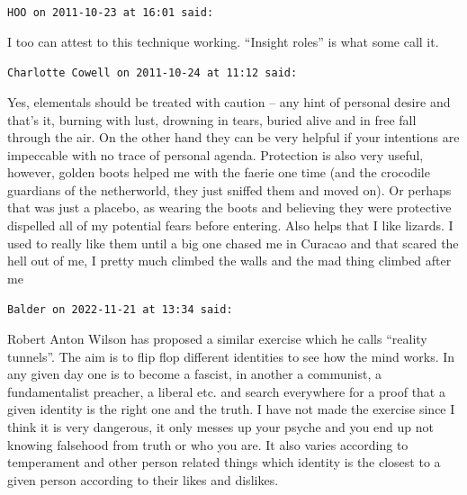 \begin{footnotesize}
\begin{sffamily}
\texttt{HOO on 2011-10-23 at 16:01 said:}

I too can attest to this technique working. ``Insight roles'' is what some call it.

\hfill

\texttt{Charlotte Cowell on 2011-10-24 at 11:12 said:}

Yes, elementals should be treated with caution -- any hint of personal desire and that's it, burning with lust, drowning in tears, buried alive and in free fall through the air. On the other hand they can be very helpful if your intentions are impeccable with no trace of personal agenda. Protection is also very useful, however, golden boots helped me with the faerie one time (and the crocodile guardians of the netherworld, they just sniffed them and moved on). Or perhaps that was just a placebo, as wearing the boots and believing they were protective dispelled all of my potential fears before entering. Also helps that I like lizards. I used to really like them until a big one chased me in Curacao and that scared the hell out of me, I pretty much climbed the walls and the mad thing climbed after me

\hfill

\texttt{Balder on 2022-11-21 at 13:34 said:}

Robert Anton Wilson has proposed a similar exercise which he calls ``reality tunnels''. The aim is to flip flop different identities to see how the mind works. In any given day one is to become a fascist, in another a communist, a fundamentalist preacher, a liberal etc. and search everywhere for a proof that a given identity is the right one and the truth. I have not made the exercise since I think it is very dangerous, it only messes up your psyche and you end up not knowing falsehood from truth or who you are. It also varies according to temperament and other person related things which identity is the closest to a given person according to their likes and dislikes.


\hfill

\end{sffamily}
\end{footnotesize}

